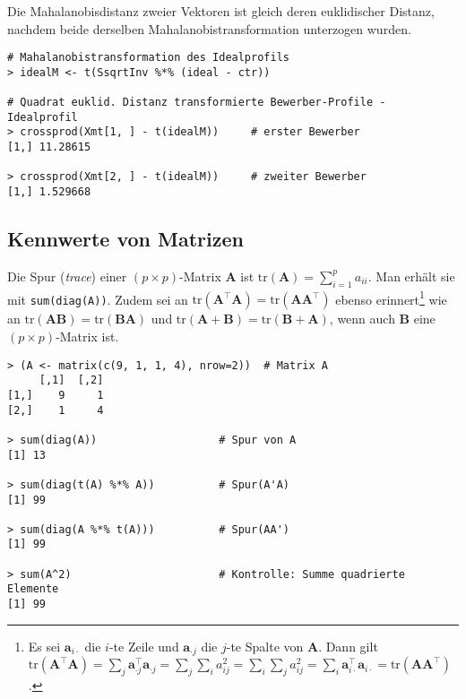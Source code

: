 Die Mahalanobisdistanz zweier Vektoren ist gleich deren euklidischer Distanz, nachdem beide derselben Mahalanobistransformation unterzogen wurden.
\begin{lstlisting}
# Mahalanobistransformation des Idealprofils
> idealM <- t(SsqrtInv %*% (ideal - ctr))

# Quadrat euklid. Distanz transformierte Bewerber-Profile - Idealprofil
> crossprod(Xmt[1, ] - t(idealM))     # erster Bewerber
[1,] 11.28615

> crossprod(Xmt[2, ] - t(idealM))     # zweiter Bewerber
[1,] 1.529668
\end{lstlisting}

\subsection{Kennwerte von Matrizen}
\label{sec:matProp}

Die Spur (\emph{trace}) einer $(p \times p)$-Matrix $\bm{A}$ ist $\text{tr}(\bm{A}) = \sum_{i=1}^{p} a_{ii}$. Man erhält sie mit \lstinline!sum(diag(A))!. Zudem sei an $\text{tr}(\bm{A}^{\top} \bm{A}) = \text{tr}(\bm{A} \bm{A}^{\top})$ ebenso erinnert\footnote{Es sei $\bm{a}_{i \cdot}$ die $i$-te Zeile und $\bm{a}_{\cdot j}$ die $j$-te Spalte von $\bm{A}$. Dann gilt $\text{tr}(\bm{A}^{\top} \bm{A}) = \sum_{j} \bm{a}_{\cdot j}^{\top} \bm{a}_{\cdot j} = \sum_{j} \sum_{i} a_{ij}^{2} = \sum_{i} \sum_{j} a_{ij}^{2} = \sum_{i} \bm{a}_{i \cdot}^{\top} \bm{a}_{i \cdot} = \text{tr}(\bm{A} \bm{A}^{\top})$.} wie an $\text{tr}(\bm{A} \bm{B}) = \text{tr}(\bm{B} \bm{A})$ und $\text{tr}(\bm{A} + \bm{B}) = \text{tr}(\bm{B} + \bm{A})$, wenn auch $\bm{B}$ eine $(p \times p)$-Matrix ist.
\begin{lstlisting}
> (A <- matrix(c(9, 1, 1, 4), nrow=2))  # Matrix A
     [,1]  [,2]
[1,]    9     1
[2,]    1     4

> sum(diag(A))                   # Spur von A
[1] 13

> sum(diag(t(A) %*% A))          # Spur(A'A)
[1] 99

> sum(diag(A %*% t(A)))          # Spur(AA')
[1] 99

> sum(A^2)                       # Kontrolle: Summe quadrierte Elemente
[1] 99
\end{lstlisting}

